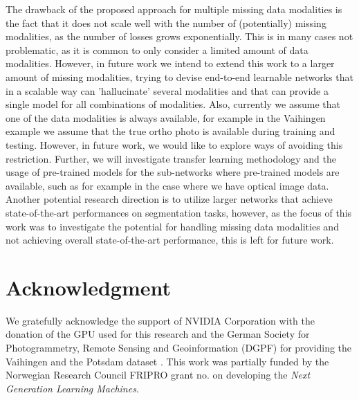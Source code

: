 \documentclass[journal]{IEEEtran}
\begin{document}
The drawback of the proposed approach for multiple missing data modalities is the fact that it does not scale well with the number of (potentially) missing modalities, as the number of losses grows exponentially. This is in many cases not problematic, as it is common to only consider a limited amount of data modalities. However, in future work we intend to extend this work to a larger amount of missing modalities, trying to devise end-to-end learnable networks that in a scalable way can 'hallucinate' several modalities and that can provide a single model for all combinations of modalities. Also, currently we assume that one of the data modalities is always available, for example in the Vaihingen example we assume that the true ortho photo is available during training and testing. However, in future work, we would like to explore ways of avoiding this restriction. Further, we will investigate transfer learning methodology and the usage of pre-trained models for the sub-networks where pre-trained models are available, such as for example in the case where we have optical image data. Another potential research direction is to utilize larger networks that achieve state-of-the-art performances on segmentation tasks, however, as the focus of this work was to investigate the potential for handling missing data modalities and not achieving overall state-of-the-art performance, this is left for future work.

\section*{Acknowledgment}
We gratefully acknowledge the support of NVIDIA Corporation with the donation of the GPU used for this research and the German Society for Photogrammetry, Remote Sensing and Geoinformation (DGPF) for providing the Vaihingen and the Potsdam dataset \cite{cramer2010dgpf}. This work was partially funded by the Norwegian Research Council FRIPRO grant no. on developing the \emph{Next Generation Learning Machines}.


\ifCLASSOPTIONcaptionsoff
  \newpage
\fi



\end{document}
